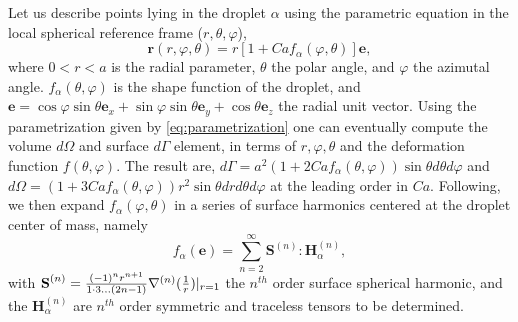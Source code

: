 Let us describe points lying in the droplet $\alpha$ using the parametric equation in the local spherical reference frame ($r,\theta,\varphi$),
\begin{equation}
    \textbf{r}(r,\varphi,\theta) = r [1+ Ca f_\alpha(\varphi,\theta)] \textbf{e},
    \label{eq:parametrization}
\end{equation}
where $0<r<a$ is the radial parameter, $\theta$ the polar angle, and $\varphi$ the azimutal angle. 
$f_\alpha(\theta,\varphi)$ is the shape function of the droplet, and $\textbf{e} = \cos\varphi\sin\theta \textbf{e}_x + \sin\varphi\sin\theta\textbf{e}_y+ \cos\theta \textbf{e}_z$ the radial unit vector. 
Using the parametrization given by \ref{eq:parametrization} one can eventually compute the volume $d\Omega$ and surface $d\Gamma$ element, in terms of $r,\varphi,\theta$ and the deformation function $f(\theta,\varphi)$.
The result are, $d\Gamma =a^2 (1+2Ca f_\alpha(\theta,\varphi)) \sin\theta d\theta d\varphi$ and $d\Omega = (1+3Ca f_\alpha(\theta,\varphi)) r^2\sin\theta drd\theta d\varphi$ at the leading order in $Ca$. 
Following, \citet{nadim1996concise,nadim1991motion} we then expand $f_\alpha(\varphi,\theta)$ in a series of surface harmonics centered at the droplet center of mass, namely 
\begin{equation}
    f_\alpha(\textbf{e}) = 
    \sum_{n=2}^\infty\textbf{S}^{(n)}:\textbf{H}_\alpha^{(n)},
    \label{eq:f_definition}
\end{equation} 
with $\textbf{S}^{(n)} = \frac{(-1)^n r^{n+1}}{1\cdot3\ldots(2n-1)}\mathbf{\nabla}^{(n)}(\frac{1}{r})|_{r=1}$ the $n^{th}$ order surface spherical harmonic, and the $\textbf{H}_\alpha^{(n)}$ are $n^{th}$ order symmetric and traceless tensors to be determined. 

